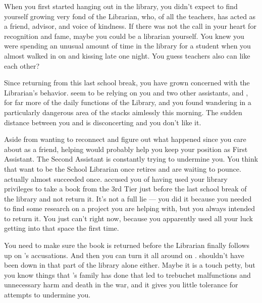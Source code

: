\documentclass[char]{GL2020}
\begin{document}
When you first started hanging out in the library, you didn’t expect to find yourself growing very fond of the Librarian, \cLibrarian{\intro} who, of all the teachers, has acted as a friend, advisor, and voice of kindness. If there was not the call in your heart for recognition and fame, maybe you could be a librarian yourself. You knew you were spending an unusual amount of time in the library for a student when you almost walked in on \cInterpol{\intro} and \cLibrarian{} kissing late one night. You guess teachers also can like each other?

 Since returning from this last school break, you have grown concerned with the Librarian’s behavior. \cLibrarian{\They} seem\cLibrarian{\verbs} to be relying on you and \cLibrarian{\their} two other assistants, \cPresident{\intro} and \cLibAssist{\intro}, for far more of the daily functions of the Library, and you found \cLibrarian{\them} wandering in a particularly dangerous area of the stacks aimlessly this morning. The sudden distance between you and \cLibrarian{} is disconcerting and you don’t like it. 

Aside from wanting to reconnect and figure out what happened since you care about \cLibrarian{} as a friend, helping  \cLibrarian{\them} would probably help you keep your position as First Assistant. The Second Assistant \cLibAssist{} is constantly trying to undermine you. You think that \cLibAssist{\they} want\cLibAssist{\verbs} to be the School Librarian once \cLibrarian{} retires and are waiting to pounce. \cLibAssist{\They} actually almost succeeded once. \cLibAssist{} accused you of having used your library privileges to take a book from the 3rd Tier just before the last school break of the library and not return it. It's not a full lie — you did it because you needed to find some research on a project you are helping \cFlowPriest{\intro} with, but you always intended to return it. You just can’t right now, because you apparently used all your luck getting into that space the first time. 

You need to make sure the book is returned before the Librarian finally follows up on \cLibAssist{}’s accusations. And then you can turn it all around on \cLibAssist{}. \cLibAssist{\They} shouldn’t have been down in that part of the library alone either. Maybe it is a touch petty, but you know things that \cLibAssist{}’s family has done that led to trebuchet malfunctions and unnecessary harm and death in the war, and it gives you little tolerance for \cLibAssist{\their} attempts to undermine you. 
\end{document}
